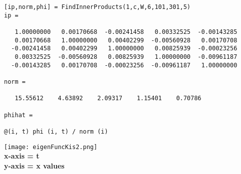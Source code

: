 \documentclass[11pt]{SelfArxOneColBMN}
\begin{document}
\begin{exercise}
\begin{lstlisting}
[ip,norm,phi] = FindInnerProducts(1,c,W,6,101,301,5)
ip =

   1.00000000   0.00170668  -0.00241458   0.00332525  -0.00143285
   0.00170668   1.00000000   0.00402299  -0.00560928   0.00170708
  -0.00241458   0.00402299   1.00000000   0.00825939  -0.00023256
   0.00332525  -0.00560928   0.00825939   1.00000000  -0.00961187
  -0.00143285   0.00170708  -0.00023256  -0.00961187   1.00000000

norm =

   15.55612    4.63892    2.09317    1.15401    0.70786

phihat =

@(i, t) phi (i, t) / norm (i)    
    \end{lstlisting}
    \texttt{[image: eigenFuncKis2.png]}\\
    \centering
    \textbf{x-axis = t}\\
    \textbf{y-axis = x values}\\
\end{exercise}
\end{document}
